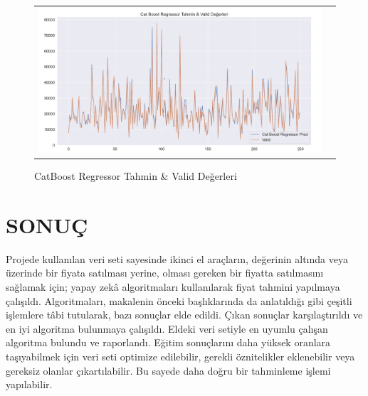 \documentclass[conference]{IEEEtran}
\begin{document}
\begin{figure}[!h]
	\centering
	\begin{center}
		\begin{tabular}{cc}
			\includegraphics[scale=0.18]{pictures/pic_22.png}&
		\end{tabular}
	\end{center}
	\caption{CatBoost Regressor Tahmin \& Valid Değerleri}
	\label{fig:22}
\end{figure}
\pagebreak


\section{\textbf{SONUÇ}}

\quad Projede kullanılan veri seti sayesinde ikinci el araçların, değerinin altında veya üzerinde bir fiyata satılması yerine, olması gereken bir fiyatta satılmasını sağlamak için; yapay zekâ algoritmaları kullanılarak fiyat tahmini yapılmaya çalışıldı. Algoritmaları, makalenin önceki başlıklarında da anlatıldığı gibi çeşitli işlemlere tâbi tutularak, bazı sonuçlar elde edildi. Çıkan sonuçlar karşılaştırıldı ve en iyi algoritma bulunmaya çalışıldı. Eldeki veri setiyle en uyumlu çalışan algoritma bulundu ve raporlandı. Eğitim sonuçlarını daha yüksek oranlara taşıyabilmek için veri seti optimize edilebilir, gerekli öznitelikler eklenebilir veya gereksiz olanlar çıkartılabilir. Bu sayede daha doğru bir tahminleme işlemi yapılabilir.
\end{document}
